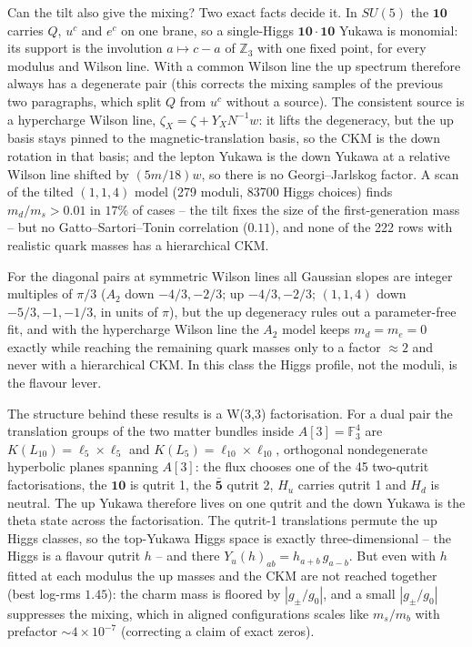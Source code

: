 Can the tilt also give the mixing? Two exact facts decide it. In $SU(5)$ the $\mathbf{10}$ carries $Q$, $u^c$ and $e^c$ on one brane, so a single-Higgs $\mathbf{10}\cdot\mathbf{10}$ Yukawa is monomial: its support is the involution $a\mapsto c-a$ of $\mathbb Z_3$ with one fixed point, for every modulus and Wilson line. With a common Wilson line the up spectrum therefore always has a degenerate pair (this corrects the mixing samples of the previous two paragraphs, which split $Q$ from $u^c$ without a source). The consistent source is a hypercharge Wilson line, $\zeta_X=\zeta+Y_XN^{-1}w$: it lifts the degeneracy, but the up basis stays pinned to the magnetic-translation basis, so the CKM is the down rotation in that basis; and the lepton Yukawa is the down Yukawa at a relative Wilson line shifted by $(5m/18)w$, so there is no Georgi--Jarlskog factor. A scan of the tilted $(1,1,4)$ model (279 moduli, 83700 Higgs choices) finds $m_d/m_s>0.01$ in $17\%$ of cases -- the tilt fixes the size of the first-generation mass -- but no Gatto--Sartori--Tonin correlation ($0.11$), and none of the 222 rows with realistic quark masses has a hierarchical CKM. 

For the diagonal pairs at symmetric Wilson lines all Gaussian slopes are integer multiples of $\pi/3$ ($A_2$ down $-4/3,-2/3$; up $-4/3,-2/3$; $(1,1,4)$ down $-5/3,-1,-1/3$, in units of $\pi$), but the up degeneracy rules out a parameter-free fit, and with the hypercharge Wilson line the $A_2$ model keeps $m_d=m_e=0$ exactly while reaching the remaining quark masses only to a factor $\approx2$ and never with a hierarchical CKM. In this class the Higgs profile, not the moduli, is the flavour lever. 

The structure behind these results is a W(3,3) factorisation. For a dual pair the translation groups of the two matter bundles inside $A[3]=\mathbb F_3^4$ are $K(L_{10})=\ell_5\times\ell_5$ and $K(L_5)=\ell_{10}\times\ell_{10}$, orthogonal nondegenerate hyperbolic planes spanning $A[3]$: the flux chooses one of the 45 two-qutrit factorisations, the $\mathbf{10}$ is qutrit 1, the $\bar{\mathbf5}$ qutrit 2, $H_u$ carries qutrit 1 and $H_d$ is neutral. The up Yukawa therefore lives on one qutrit and the down Yukawa is the theta state across the factorisation. The qutrit-1 translations permute the up Higgs classes, so the top-Yukawa Higgs space is exactly three-dimensional -- the Higgs is a flavour qutrit $h$ -- and there $Y_u(h)_{ab}=h_{a+b}\,g_{a-b}$. But even with $h$ fitted at each modulus the up masses and the CKM are not reached together (best log-rms $1.45$): the charm mass is floored by $|g_\pm/g_0|$, and a small $|g_\pm/g_0|$ suppresses the mixing, which in aligned configurations scales like $m_s/m_b$ with prefactor $\sim4\times10^{-7}$ (correcting a claim of exact zeros). 

